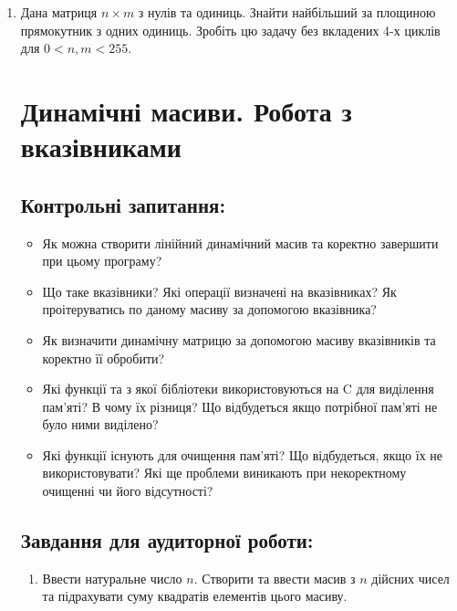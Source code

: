 \documentclass[a5paper,titlepage,openany,twoside,
]
{book_unv}%
\begin{document}
\begin{enumerate}
\def\labelenumi{\arabic{enumi})}
\setcounter{enumi}{32}
\item
  Дана матриця $n \times m$ з нулів та одиниць. Знайти найбільший за площиною
  прямокутник з одних одиниць. Зробіть цю задачу без вкладених 4-х
  циклів для $0<n,m<255$.



\chapter{Динамічні масиви. Робота з вказівниками }
%

\section{Контрольні запитання:}
\begin{itemize}
\item
  Як можна створити лінійний динамічний масив та коректно завершити при
  цьому програму?
\item
  Що таке вказівники? Які операції визначені на вказівниках? Як
  проітеруватись по даному масиву за допомогою вказівника?
\item
  Як визначити динамічну матрицю за допомогою масиву вказівників та
  коректно її обробити?
\item
  Які функції та з якої бібліотеки використовуються на C для виділення
  пам'яті? В чому їх різниця? Що відбудеться якщо потрібної пам'яті не
  було ними виділено?
\item
  Які функції існують для очищення пам'яті? Що відбудеться, якщо їх не
  використовувати? Які ще проблеми виникають при некоректному очищенні
  чи його відсутності?
\end{itemize}

\section{Завдання для аудиторної роботи:}

\begin{enumerate}
\def\labelenumi{\arabic{enumi})}
\item
  Ввести натуральне число $n$. Створити та ввести масив з $n$ дійсних чисел та
  підрахувати суму квадратів елементів цього масиву. 


\end{enumerate}
\end{enumerate}
\end{document}
